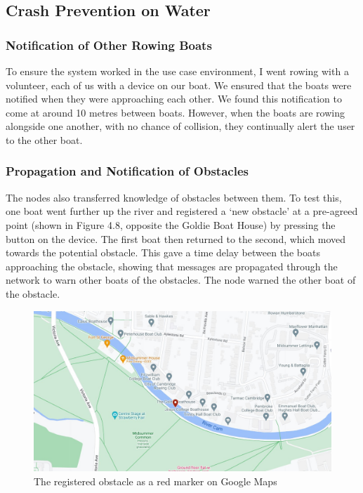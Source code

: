 \documentclass[12pt,a4paper]{report}
\begin{document}
\subsection{Crash Prevention on Water}
\subsubsection{Notification of Other Rowing Boats}
To ensure the system worked in the use case environment, I went rowing with a volunteer, each of us with a device on our boat. We ensured that the boats were notified when they were approaching each other. We found this notification to come at around 10 metres between boats. However, when the boats are rowing alongside one another, with no chance of collision, they continually alert the user to the other boat. \\
\subsubsection{Propagation and Notification of Obstacles}
The nodes also transferred knowledge of obstacles between them. To test this, one boat went further up the river and registered a `new obstacle' at a pre-agreed point (shown in Figure 4.8, opposite the Goldie Boat House) by pressing the button on the device. The first boat then returned to the second, which moved towards the potential obstacle. This gave a time delay between the boats approaching the obstacle, showing that messages are propagated through the network to warn other boats of the obstacles. The node warned the other boat of the obstacle. 
\begin{figure}[h]
\begin{center}
\includegraphics[scale=0.3]{obstacle.jpg}
\end{center}
\caption{The registered obstacle as a red marker on Google Maps \cite{googlemapsgeneral}}
\end{figure}
\end{document}
